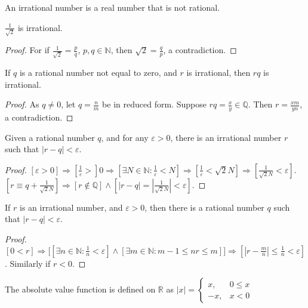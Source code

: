 \documentclass[crop=false,class=article,oneside]{standalone}
\begin{document}
            \begin{definition}
            An irrational number is a real number that is not rational.
            \end{definition}
            \begin{corollary}
            $\frac{1}{\sqrt{2}}$ is irrational. 
            \end{corollary}
            \begin{proof}
            For if $\frac{1}{\sqrt{2}} = \frac{p}{q}$, $p,q\in \mathbb{N}$, then $\sqrt{2} = \frac{q}{p}$, a contradiction.
            \end{proof}
            \begin{lemma}
            If $q$ is a rational number not equal to zero, and $r$ is irrational, then $rq$ is irrational.
            \end{lemma}
            \begin{proof}
            As $q\ne 0$, let $q = \frac{n}{m}$ be in reduced form. Suppose $rq = \frac{x}{y}\in \mathbb{Q}$. Then $r=\frac{xm}{yn}$, a contradiction.
            \end{proof}
            \begin{theorem}
            Given a rational number $q$, and for any $\varepsilon>0$, there is an irrational number $r$ such that $|r-q|<\varepsilon$.
            \end{theorem}
            \begin{proof}
            $[\varepsilon>0]\Rightarrow [\frac{1}{\varepsilon}>]0\Rightarrow [\exists N\in \mathbb{N}:\frac{1}{\varepsilon}<N]\Rightarrow [\frac{1}{\varepsilon} < \sqrt{2}N]\Rightarrow [\frac{1}{\sqrt{2}N}< \varepsilon]$. $[r \equiv q+\frac{1}{\sqrt{2}{N}}]\Rightarrow [r\notin \mathbb{Q}]\land [|r-q| = |\frac{1}{\sqrt{2}N}| < \varepsilon]$.
            \end{proof}
            \begin{theorem}
            If $r$ is an irrational number, and $\varepsilon>0$, then there is a rational number $q$ such that $|r-q|<\varepsilon$.
            \end{theorem}
            \begin{proof}
            $[0<r]\Rightarrow \big[[\exists n\in \mathbb{N}: \frac{1}{n} < \varepsilon]\land[\exists m\in \mathbb{N}: m-1\leq nr \leq m]\big]\Rightarrow[|r-\frac{m}{n}| \leq \frac{1}{n} < \varepsilon]$. Similarly if $r<0$.
            \end{proof}
            \begin{definition}
            The absolute value function is defined on $\mathbb{R}$ as $|x| = \begin{cases} x, & 0 \leq x \\ -x, & x<0 \end{cases}$
            \end{definition}
\end{document}
